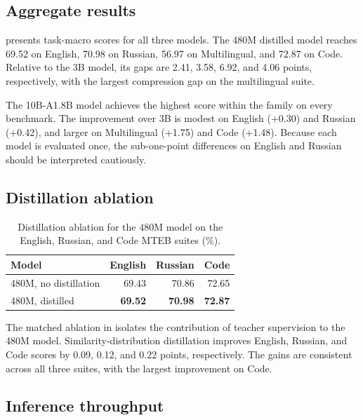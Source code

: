 \documentclass{article}
\begin{document}
\subsection{Aggregate results}

 presents task-macro scores for all three models.
The 480M distilled model reaches 69.52 on English, 70.98 on Russian, 56.97 on Multilingual, and 72.87 on Code.
Relative to the 3B model, its gaps are 2.41, 3.58, 6.92, and 4.06 points, respectively, with the largest compression gap on the multilingual suite.

The 10B-A1.8B model achieves the highest score within the family on every benchmark.
The improvement over 3B is modest on English (+0.30) and Russian (+0.42), and larger on Multilingual (+1.75) and Code (+1.48).
Because each model is evaluated once, the sub-one-point differences on English and Russian should be interpreted cautiously.

\subsection{Distillation ablation}

\begin{table}[!t]
  \caption{Distillation ablation for the 480M model on the English, Russian, and Code MTEB suites (\%).}
  \label{tab:distillation-ablation}
  \centering
  \small
  \setlength{\tabcolsep}{3.5pt}
  \begin{tabular}{lrrr}
    \toprule
    \textbf{Model} & \textbf{English} & \textbf{Russian} & \textbf{Code} \\
    \midrule
    480M, no distillation & 69.43 & 70.86 & 72.65 \\
    480M, distilled       & \textbf{69.52} & \textbf{70.98} & \textbf{72.87} \\
    \bottomrule
  \end{tabular}
\end{table}

The matched ablation in  isolates the contribution of teacher supervision to the 480M model.
Similarity-distribution distillation improves English, Russian, and Code scores by 0.09, 0.12, and 0.22 points, respectively.
The gains are consistent across all three suites, with the largest improvement on Code.

\subsection{Inference throughput}
\end{document}
